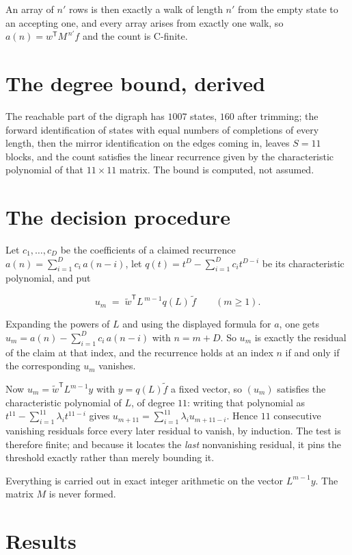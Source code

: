 \documentclass[11pt]{article}
\theoremstyle{definition}
\begin{document}
An array of $n'$ rows is then exactly a walk of length $n'$ from the empty state to an accepting one, and every array arises from exactly one walk, so $a(n) = w^{\mathsf T}M^{\,n'}f$ and the count is C-finite.

\section{The degree bound, derived}

The reachable part of the digraph has $1007$ states, $160$ after trimming; the forward identification of states with equal numbers of completions of every length, then the mirror identification on the edges coming in, leaves $S = 11$ blocks, and the count satisfies the linear recurrence given by the characteristic polynomial of that $11\times11$ matrix. The bound is computed, not assumed.

\section{The decision procedure}

Let $c_1,\dots,c_D$ be the coefficients of a claimed recurrence $a(n) = \sum_{i=1}^{D} c_i\,a(n-i)$, let $q(t) = t^{D} - \sum_{i=1}^{D} c_i t^{D-i}$ be its characteristic polynomial, and put

\[u_m \;=\; \tilde w^{\mathsf T} L^{\,m-1} q(L)\,\tilde f \qquad (m \ge 1).\]

Expanding the powers of $L$ and using the displayed formula for $a$, one gets $u_m = a(n) - \sum_{i=1}^{D} c_i\,a(n-i)$ with $n = m + D$. So $u_m$ is exactly the residual of the claim at that index, and the recurrence holds at an index $n$ if and only if the corresponding $u_m$ vanishes.

Now $u_m = \tilde w^{\mathsf T} L^{m-1} y$ with $y = q(L)\tilde f$ a fixed vector, so $(u_m)$ satisfies the characteristic polynomial of $L$, of degree $11$: writing that polynomial as $t^{11} - \sum_{i=1}^{11} \lambda_i t^{11-i}$ gives $u_{m+11} = \sum_{i=1}^{11} \lambda_i u_{m+11-i}$. Hence $11$ consecutive vanishing residuals force every later residual to vanish, by induction. The test is therefore finite; and because it locates the {\itshape last} nonvanishing residual, it pins the threshold exactly rather than merely bounding it.

Everything is carried out in exact integer arithmetic on the vector $L^{m-1}y$. The matrix $M$ is never formed.

\section{Results}
\end{document}
